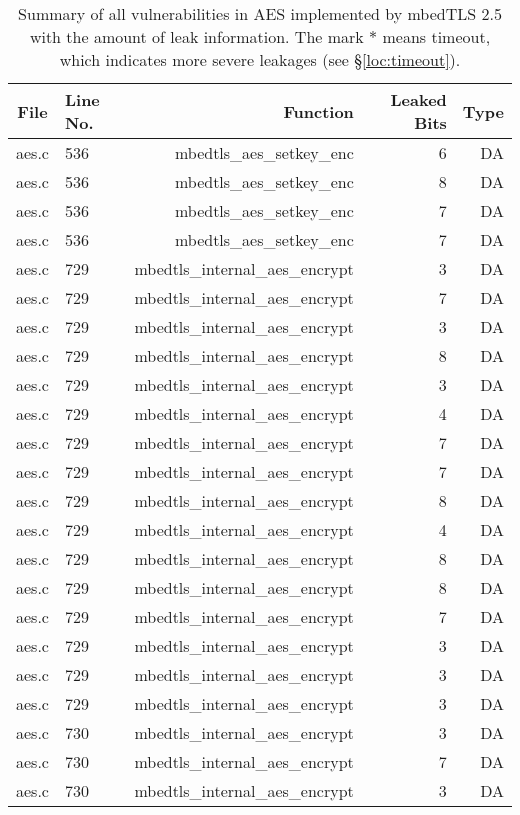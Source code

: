 \begin{table}[h!]
\centering\tiny\scriptsize
\caption{Summary of all vulnerabilities in AES implemented by mbedTLS 2.5 with the amount of leak information. The mark $*$ means timeout, which indicates more severe leakages (see \S\ref{loc:timeout}).}\label{tab:AESmbedTLS}
\begin{tabular}{clrrr}
\hline
\textbf{File} & \textbf{Line No.} & \textbf{Function} & \textbf{Leaked Bits} & \textbf{Type} \\\hline
aes.c& 536&mbedtls\_aes\_setkey\_enc&6 &DA\\
aes.c& 536&mbedtls\_aes\_setkey\_enc&8 &DA\\
aes.c& 536&mbedtls\_aes\_setkey\_enc&7 &DA\\
aes.c& 536&mbedtls\_aes\_setkey\_enc&7 &DA\\
aes.c& 729&mbedtls\_internal\_aes\_encrypt&3 &DA\\
aes.c& 729&mbedtls\_internal\_aes\_encrypt&7 &DA\\
aes.c& 729&mbedtls\_internal\_aes\_encrypt&3 &DA\\
aes.c& 729&mbedtls\_internal\_aes\_encrypt&8 &DA\\
aes.c& 729&mbedtls\_internal\_aes\_encrypt&3 &DA\\
aes.c& 729&mbedtls\_internal\_aes\_encrypt&4 &DA\\
aes.c& 729&mbedtls\_internal\_aes\_encrypt&7 &DA\\
aes.c& 729&mbedtls\_internal\_aes\_encrypt&7 &DA\\
aes.c& 729&mbedtls\_internal\_aes\_encrypt&8 &DA\\
aes.c& 729&mbedtls\_internal\_aes\_encrypt&4 &DA\\
aes.c& 729&mbedtls\_internal\_aes\_encrypt&8 &DA\\
aes.c& 729&mbedtls\_internal\_aes\_encrypt&8 &DA\\
aes.c& 729&mbedtls\_internal\_aes\_encrypt&7 &DA\\
aes.c& 729&mbedtls\_internal\_aes\_encrypt&3 &DA\\
aes.c& 729&mbedtls\_internal\_aes\_encrypt&3 &DA\\
aes.c& 729&mbedtls\_internal\_aes\_encrypt&3 &DA\\
aes.c& 730&mbedtls\_internal\_aes\_encrypt&3 &DA\\
aes.c& 730&mbedtls\_internal\_aes\_encrypt&7 &DA\\
aes.c& 730&mbedtls\_internal\_aes\_encrypt&3 &DA\\

\end{tabular}
\end{table}
